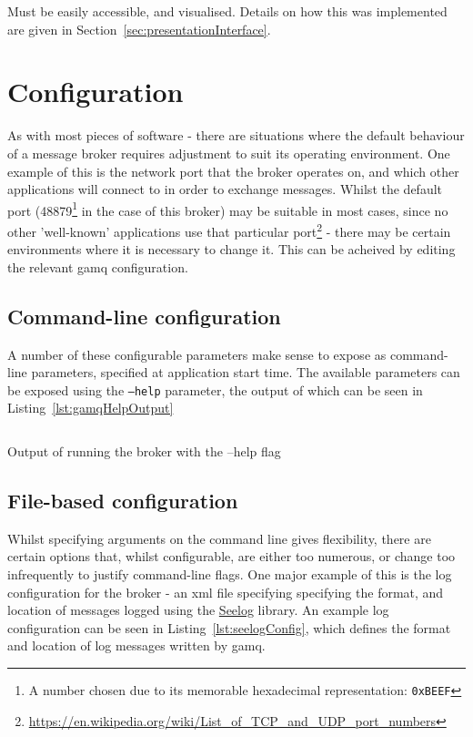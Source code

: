 Must be easily accessible, and visualised. Details on how this was implemented
are given in Section~\ref{sec:presentationInterface}.

\section{Configuration}
\label{sec:Configuration}

As with most pieces of software - there are situations where the default
behaviour of a message broker requires adjustment to suit its operating
environment. One example of this is the network port that the broker operates
on, and which other applications will connect to in order to exchange messages.
Whilst the default port (48879\footnote{A number chosen due to its memorable
hexadecimal representation: \texttt{0xBEEF}} in the case of this broker) may be
suitable in most cases, since no other 'well-known' applications use that
particular
port\footnote{\url{https://en.wikipedia.org/wiki/List_of_TCP_and_UDP_port_numbers}} -
there may be certain environments where it is necessary to change it. This can
be acheived by editing the relevant gamq configuration.

\subsection{Command-line configuration}
\label{sub:Command-line configuration}

A number of these configurable parameters make sense to expose as command-line
parameters, specified at application start time. The available parameters can be
exposed using the \texttt{--help} parameter, the output of which can be seen in
Listing~\ref{lst:gamqHelpOutput}

\begin{listing}[ht]
  \centering
  \inputminted{bash}{code/gamqHelpOutput}
  \caption{Output of running the broker with the --help flag}
  \label{lst:gamqHelpOutput}
\end{listing}

\subsection{File-based configuration}
\label{sub:File-based configuration}

Whilst specifying arguments on the command line gives flexibility, there are
certain options that, whilst configurable, are either too numerous, or change
too infrequently to justify command-line flags. One major example of this is the
log configuration for the broker - an \gls{xml} file specifying specifying the
format, and location of messages logged using the
\href{https://github.com/cihub/seelog}{Seelog} library. An example log
configuration can be seen in Listing~\ref{lst:seelogConfig}, which defines the
format and location of log messages written by gamq.

